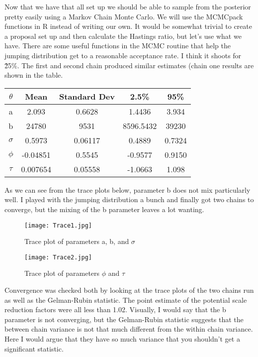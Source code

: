 \documentclass{article}
\begin{document}
Now that we have that all set up we should be able to sample from the posterior pretty easily using a Markov Chain Monte Carlo. We will use the MCMCpack functions in R instead of writing our own. It would be somewhat trivial to create a proposal set up and then calculate the Hastings ratio, but let's use what we have. There are some useful functions in the MCMC routine that help the jumping distribution get to a reasonable acceptance rate. I think it shoots for \~25\%. The first and second chain produced similar estimates (chain one results are shown in the table. 

\begin{center}
    \begin{tabular}{c c c c c}
    \hline
    $\theta$ & Mean & Standard Dev & 2.5\% & 95\% \\ \hline
    a & 2.093 & 0.6628 & 1.4436  & 3.934\\ 
    b & 24780 & 9531 & 8596.5432 & 39230\\ 
$\sigma$ &0.5973 & 0.06117 &0.4889     & 0.7324\\ 
$\phi$ &-0.04851 & 0.5545 &-0.9577    & 0.9150\\ 
$\tau$ & 0.007654 & 0.05558 &-1.0663    & 1.098\\ 
    \hline
    \end{tabular}
\end{center}

As we can see from the trace plots below, parameter b does not mix particularly well. I played with the jumping distribution a bunch and finally got two chains to converge, but the mixing of the b parameter leaves a lot wanting. 

\begin{figure}[H]
    \centering
    \texttt{[image: Trace1.jpg]}
    \caption{Trace plot of parameters a, b, and $\sigma$}
    \label{Fig.2}
\end{figure}

\begin{figure}[H]
    \centering
    \texttt{[image: Trace2.jpg]}
    \caption{Trace plot of parameters $\phi$ and $\tau$}
    \label{Fig.3}
\end{figure}

Convergence was checked both by looking at the trace plots of the two chains run as well as the Gelman-Rubin statistic. The point estimate of the potential scale reduction factors were all less than 1.02. Visually, I would say that the b parameter is not converging, but the Gelman-Rubin statistic suggests that the between chain variance is not that much different from the within chain variance. Here I would argue that they have so much variance that you shouldn't get a significant statistic. 
\end{document}
